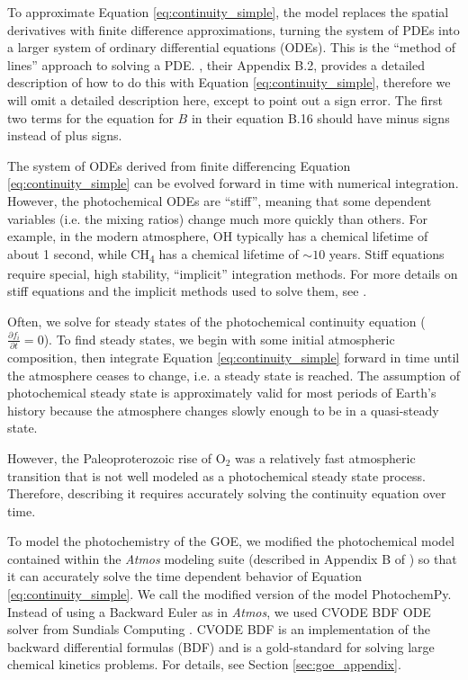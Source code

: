 To approximate Equation \eqref{eq:continuity_simple}, the model replaces the spatial derivatives with finite difference approximations, turning the system of PDEs into a larger system of ordinary differential equations (ODEs). This is the ``method of lines'' approach to solving a PDE. \citet{Catling_2017}, their Appendix B.2, provides a detailed description of how to do this with Equation \eqref{eq:continuity_simple}, therefore we will omit a detailed description here, except to point out a sign error. The first two terms for the equation for $B$ in their equation B.16 should have minus signs instead of plus signs.

The system of ODEs derived from finite differencing Equation \eqref{eq:continuity_simple} can be evolved forward in time with numerical integration. However, the photochemical ODEs are ``stiff'', meaning that some dependent variables (i.e. the mixing ratios) change much more quickly than others. For example, in the modern atmosphere, OH typically has a chemical lifetime of about 1 second, while CH\textsubscript{4} has a chemical lifetime of ${\sim}10$ years. Stiff equations require special, high stability, ``implicit'' integration methods. For more details on stiff equations and the implicit methods used to solve them, see \citet{Hairer_1996}.

Often, we solve for steady states of the photochemical continuity equation ($\frac{\partial f_{i}}{\partial t} = 0$). To find steady states, we begin with some initial atmospheric composition, then integrate Equation \eqref{eq:continuity_simple} forward in time until the atmosphere ceases to change, i.e. a steady state is reached. The assumption of photochemical steady state is approximately valid for most periods of Earth's history because the atmosphere changes slowly enough to be in a quasi-steady state.

However, the Paleoproterozoic rise of O$_2$ was a relatively fast atmospheric transition that is not well modeled as a photochemical steady state process. Therefore, describing it requires accurately solving the continuity equation over time.

To model the photochemistry of the GOE, we modified the photochemical model contained within the \textit{Atmos} modeling suite (described in Appendix B of \citet{Catling_2017}) so that it can accurately solve the time dependent behavior of Equation \eqref{eq:continuity_simple}. We call the modified version of the model PhotochemPy. Instead of using a Backward Euler as in \textit{Atmos}, we used CVODE BDF ODE solver from Sundials Computing \citep{Hindmarsh_2005}. CVODE BDF is an implementation of the backward differential formulas (BDF) and is a gold-standard for solving large chemical kinetics problems. For details, see Section \ref{sec:goe_appendix}.


